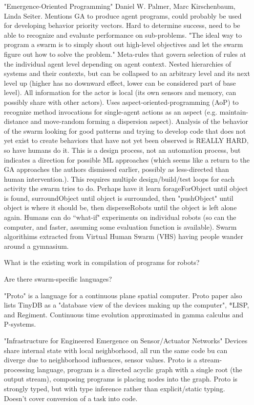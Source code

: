 \documentclass[]{article}
\begin{document}
"Emergence-Oriented Programming" \cite{palmer2005emergence} Daniel W. Palmer, Marc Kirschenbaum, Linda Seiter. Mentions GA to produce agent programs, could probably be used for developing behavior priority vectors. Hard to determine success, need to be able to recognize and evaluate performance on sub-problems. "The ideal way to program a swarm is to simply shout out high-level objectives and let the swarm figure out how to solve the problem." Meta-rules that govern selection of rules at the individual agent level depending on agent context. Nested hierarchies of systems and their contexts, but can be collapsed to an arbitrary level and its next level up (higher has no downward effect, lower can be considered part of base level). All information for the actor is local (its own sensors and memory, can possibly share with other actors). Uses aspect-oriented-programming (AoP) to recognize method invocations for single-agent actions as an aspect (e.g. maintain-distance and move-random forming a dispersion aspect). Analysis of the behavior of the swarm looking for good patterns and trying to develop code that does not yet exist to create behaviors that have not yet been observed is REALLY HARD, so have humans do it. This is a design process, not an automation process, but indicates a direction for possible ML approaches (which seems like a return to the GA approaches the authors dismissed earlier, possibly as less-directed than human intervention.). This requires multiple design/build/test loops for each activity the swarm tries to do. Perhaps have it learn forageForObject until object is found, surroundObject until object is surrounded, then "pushObject" until object is where it should be, then disperseRobots until the object is left alone again. Humans can do ``what-if" experiments on individual robots (so can the computer, and faster, assuming some evaluation function is available). Swarm algorithims extracted from Virtual Human Swarm (VHS) having people wander around a gymnasium. 

What is the existing work in compilation of programs for robots? 

Are there swarm-specific languages? 

"Proto" is a language for a continuous plane spatial computer. Proto paper also lists TinyDB as a "database view of the devices making up the computer", *LISP, and Regiment. Continuous time evolution approximated in gamma calculus and P-systems. 

"Infrastructure for Engineered Emergence on Sensor/Actuator Networks" \cite{beal2006infrastructure} Devices share internal state with local neighborhood, all run the same code bu can diverge due to neighborhood influences, sensor values. Proto is a stream-processing language, program is a directed acyclic graph with a single root (the output stream), composing programs is placing nodes into the graph. Proto is strongly typed, but with type inference rather than explicit/static typing. Doesn't cover conversion of a task into code. 
\end{document}

